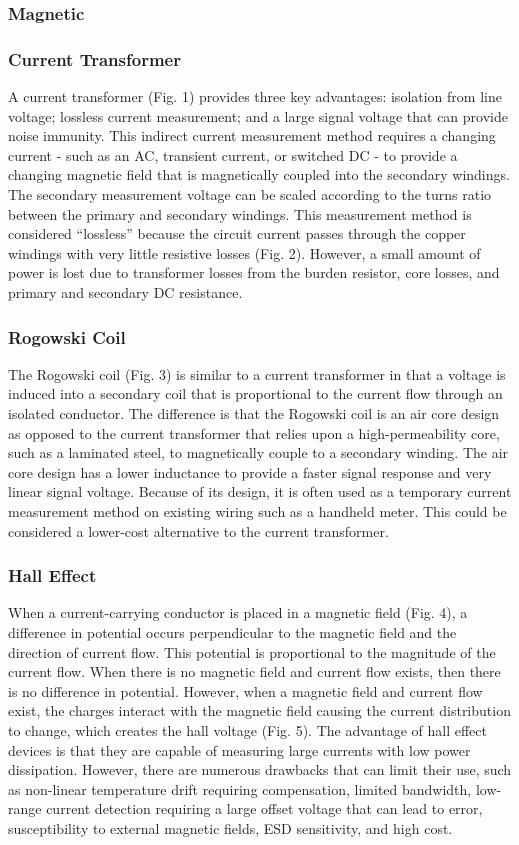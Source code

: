 \documentclass[12pt,a4paper,titlepage,openany]{report}
\begin{document}
\subsubsection{Magnetic}
\subsubsection{Current Transformer}
A current transformer (Fig. 1) provides three key advantages: isolation from line voltage; lossless current measurement; and a
large signal voltage that can provide noise immunity. This indirect current measurement method requires a changing current -
such as an AC, transient current, or switched DC - to provide a changing magnetic field that is magnetically coupled into the
secondary windings. The secondary measurement voltage can be scaled according to the turns ratio between the primary and
secondary windings. This measurement method is considered “lossless” because the circuit current passes through the copper
windings with very little resistive losses (Fig. 2). However, a small amount of power is lost due to transformer losses from the
burden resistor, core losses, and primary and secondary DC resistance.

\subsubsection{Rogowski Coil}
The Rogowski coil (Fig. 3) is similar to a current transformer in that a voltage is induced into a secondary coil that is proportional
to the current flow through an isolated conductor. The difference is that the Rogowski coil is an air core design as opposed to
the current transformer that relies upon a high-permeability core, such as a laminated steel, to magnetically couple to a
secondary winding. The air core design has a lower inductance to provide a faster signal response and very linear signal voltage.
Because of its design, it is often used as a temporary current measurement method on existing wiring such as a handheld meter.
This could be considered a lower-cost alternative to the current transformer.

\subsubsection{Hall Effect}
When a current-carrying conductor is placed in a magnetic field (Fig. 4), a difference in potential occurs perpendicular to the
magnetic field and the direction of current flow. This potential is proportional to the magnitude of the current flow. When there
is no magnetic field and current flow exists, then there is no difference in potential. However, when a magnetic field and current
flow exist, the charges interact with the magnetic field causing the current distribution to change, which creates the hall voltage
(Fig. 5).
The advantage of hall effect devices is that they are capable of measuring large currents with low power dissipation. However,
there are numerous drawbacks that can limit their use, such as non-linear temperature drift requiring compensation, limited
bandwidth, low-range current detection requiring a large offset voltage that can lead to error, susceptibility to external magnetic
fields, ESD sensitivity, and high cost.
\end{document}
